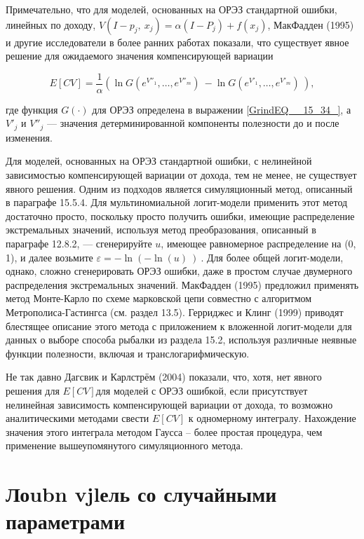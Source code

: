 Примечательно, что для моделей, основанных на ОРЭЗ стандартной ошибки, линейных по доходу, $V\left(I-p_j,\ x_j\right)=\alpha \left(I-P_j\right)+f(x_j)$, МакФадден (1995) и другие исследователи в более ранних работах показали, что существует явное решение для ожидаемого значения компенсирующей вариации

\[E\left[CV\right]=\frac{1}{\alpha }\left({\ln  G\left(e^{V''_1},\dots ,e^{V''_m}\right)\ }-{\ln  G\left(e^{V'_1},\dots ,e^{V'_m}\right)\ }\right),\] 

где функция $G(\cdot )$ для ОРЭЗ определена в выражении \eqref{GrindEQ__15_34_}, а $V'_j$ и $V''_j$ --- значения детерминированной компоненты полезности до и после изменения.

Для моделей, основанных на  ОРЭЗ стандартной ошибки, с нелинейной зависимостью компенсирующей вариации от дохода, тем не менее, не существует явного решения. Одним из подходов является симуляционный метод, описанный в параграфе 15.5.4. Для мультиномиальной логит-модели применить этот метод достаточно просто, поскольку просто получить ошибки, имеющие распределение экстремальных значений, используя метод преобразования, описанный в параграфе 12.8.2, --- сгенерируйте $u$, имеющее равномерное распределение на (0, 1), и  далее возьмите $\varepsilon =-{\ln  (-{\ln  (u)\ })\ }$. Для более общей логит-модели, однако, сложно сгенерировать ОРЭЗ ошибки, даже в простом случае двумерного распределения экстремальных значений. МакФадден (1995) предложил применять метод Монте-Карло по схеме марковской цепи совместно с алгоритмом Метрополиса-Гастингса (см. раздел 13.5). Герриджес и Клинг (1999) приводят блестящее описание этого метода с приложением к вложенной логит-модели для данных о выборе способа рыбалки из раздела 15.2, используя различные неявные функции полезности, включая и транслогарифмическую.

Не так давно Дагсвик и Карлстрём (2004) показали, что, хотя, нет явного решения для $E\left[CV\right]$для моделей с ОРЭЗ ошибкой, если присутствует нелинейная зависимость компенсирующей вариации от дохода, то возможно аналитическими методами свести $E\left[CV\right]$ к одномерному интегралу. Нахождение значения этого интеграла методом Гаусса -- более простая процедура, чем применение вышеупомянутого симуляционного метода.

\section{Лоubn vjlель со случайными параметрами}

